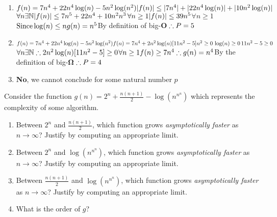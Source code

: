 \documentclass[11pt]{amsart}
\newcommand{\ds}{\displaystyle}
\newcommand{\be}{\begin{enumerate}}
\newcommand{\ee}{\end{enumerate}}
\begin{document}
	\begin{sol}
	\be
		\item
		$f(n) = 7n^4 + 22n^4\log(n)-5n^2\log(n^2)\\
		|f(n)| \leq |7n^4| + |22n^4\log(n)| + |10n^2\log(n)| $\hfill$ \forall n \exists \mathbb{N}\\
		|f(n)| \leq 7n^5 + 22n^4 +10n^2n^3 $\hfill$\forall n \geq 1\\
		|f(n)| \leq 39n^5 $\hfill$ \forall n \geq 1 $  ${\text{Since} \log(n) \leq n}\\
		g(n) = n^5 $\hfill By definition of big-\textbf{O}$\\
		\therefore P = 5$
		
		\item
		$f(n) = 7n^4 + 22n^4\log(n)-5n^2\log(n^2)\\
		f(n) = 7n^4 + 2n^2\log(n)[11n^2 - 5]\\
		n^2 \geq 0 \, \log(n) \geq 0 \, 11n^2-5 \geq 0 $\hfill$ \forall n \exists \mathbb{N}\\
		\therefore 2n^2\log(n)[11n^2 - 5] \geq 0 $\hfill$ \forall n \geq 1\\
		f(n) \geq 7n^4\\
		\therefore g(n) = n^4 $\hfill By the definition of big-\textbf{$\boldsymbol{\Omega}$}$\\ 
		\therefore P = 4$

		\item \textbf{No}, we cannot conclude for some natural number $p$

	\ee
	\end{sol}

\item Consider the function $\ds g(n) = 2^n + \frac{n(n+1)}{2} -\log{\left( n^{n^n}\right) }$ which represents the complexity of some algorithm. 
	\be
		\item Between $2^n$ and $\frac{n(n+1)}{2}$, which function grows \textit{asymptotically faster} as $n \to \infty$?  Justify by computing an appropriate limit.
		\item Between $2^n$ and $\log{\left( n^{n^n}\right) }$, which function grows \textit{asymptotically faster} as $n \to \infty$?  Justify by computing an appropriate limit.
		\item Between $\frac{n(n+1)}{2}$ and $\log{\left( n^{n^n}\right) }$, which function grows \textit{asymptotically faster} as $n \to \infty$?  Justify by computing an appropriate limit.
		\item What is the order of $g$?	
	\ee
		
\end{document}
